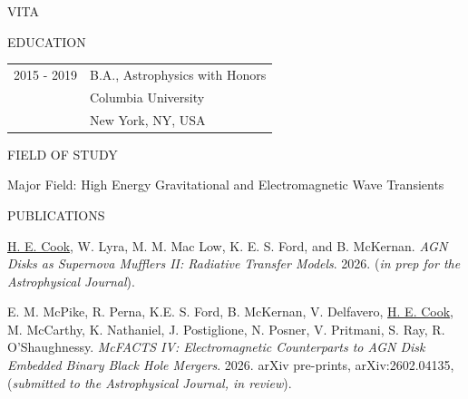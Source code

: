 \begin{center}
 VITA
\end{center}

\medskip

\begin{center}
EDUCATION
\end{center}


\begin{flushleft}
\begin{tabular}{ll}
 
2015 - 2019 &  B.A., Astrophysics with Honors \\
 & Columbia University \\
 & New York, NY, USA
\end{tabular}
\end{flushleft}

\medskip

\singlespace

\medskip

\begin{center}
FIELD OF STUDY
\end{center}
\begin{flushleft}
Major Field: High Energy Gravitational and Electromagnetic Wave Transients
\end{flushleft}

\begin{center}
PUBLICATIONS %
\end{center}

\hangindent=0.5in \noindent \underline{H. E. Cook}, W. Lyra, M. M. Mac Low, K. E. S. Ford, and B. McKernan. \textit{AGN Disks as Supernova Mufflers II: Radiative Transfer Models}. 2026. (\textit{in prep for the Astrophysical Journal}).

\hangindent=0.5in \noindent E. M. McPike, R. Perna, K.E. S. Ford, B. McKernan, V. Delfavero, \underline{H. E. Cook}, M. McCarthy, K. Nathaniel, J. Postiglione, N. Posner, V. Pritmani, S. Ray, R. O'Shaughnessy. \textit{McFACTS IV: Electromagnetic Counterparts to AGN Disk Embedded Binary Black Hole Mergers}. 2026. arXiv pre-prints, arXiv:2602.04135, (\textit{submitted to the Astrophysical Journal, in review}).

